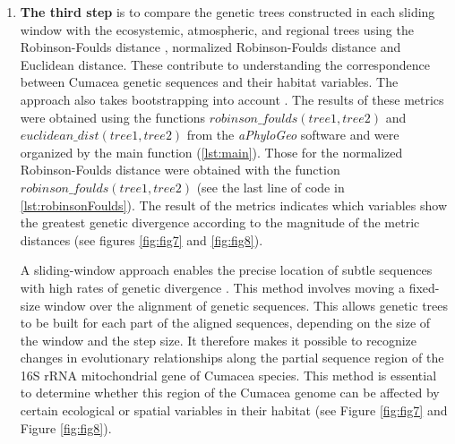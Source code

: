 {\begin{enumerate}
In our case, we set up the \textit{aPhyloGeo} software as follows: $pairwiseAligner$ for sequence alignment; $\text{Hamming distance}$ to measure simple dissimilarities between sequences; $\text{Wider Fit by elongating with Gap (starAlignment)}$ algorithm takes alignment gaps into account, which is often mandatory in the case of major deletions or insertions in the sequences; $\text{windows\_size}$: 10 nucleotide (nt); and finally, $\text{step\_size}$: 1 nt. The last two configurations imply that for each 10 nt window, a phylogenetic tree is produced using the 10 nt sequence of each Cumacea. Next, the window is moved by 1 nt, creating a new tree with the next 10 nt, and so on until the end of the alignment. Genetic trees will be stored in an object called $T_1$, while spatial and ecological trees will be stored in another object called $T_2$.

\item \textbf{The third step} is to compare the genetic trees constructed in each sliding window with the ecosystemic, atmospheric, and regional trees using the Robinson-Foulds distance \citep{robinson_comparison_1981}, normalized Robinson-Foulds distance and Euclidean distance. These contribute to understanding the correspondence between Cumacea genetic sequences and their habitat variables. The approach also takes bootstrapping into account \citep{koshkarov_phylogeography_2022}. The results of these metrics were obtained using the functions $robinson\_foulds(tree1, tree2)$ and $euclidean\_dist(tree1, tree2)$ from the \textit{aPhyloGeo} software and were organized by the main function (\autoref{lst:main}). Those for the normalized Robinson-Foulds distance were obtained with the function $robinson\_foulds(tree1, tree2)$ (see the last line of code in \autoref{lst:robinsonFoulds}). The result of the metrics indicates which variables show the greatest genetic divergence according to the magnitude of the metric distances (see figures \ref{fig:fig7} and \ref{fig:fig8}).

A sliding-window approach enables the precise location of subtle sequences with high rates of genetic divergence \citep{koshkarov_phylogeography_2022}. This method involves moving a fixed-size window over the alignment of genetic sequences. This allows genetic trees to be built for each part of the aligned sequences, depending on the size of the window and the step size. It therefore makes it possible to recognize changes in evolutionary relationships along the partial sequence region of the 16S rRNA mitochondrial gene of Cumacea species. This method is essential to determine whether this region of the Cumacea genome can be affected by certain ecological or spatial variables in their habitat (see Figure \ref{fig:fig7} and Figure \ref{fig:fig8}).
\end{enumerate}

}
